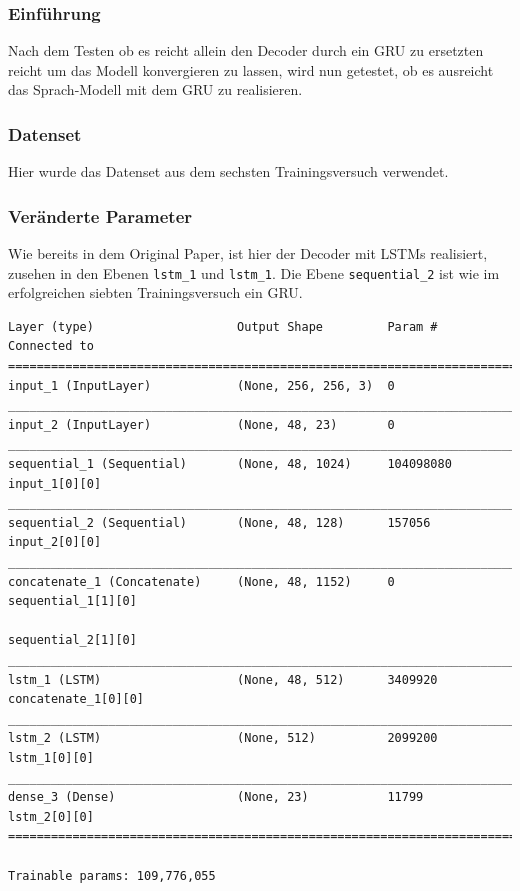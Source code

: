 \documentclass[pdftex,a4paper,halfparskip, article]{scrartcl}
\begin{document}
\subsubsection*{Einführung}

Nach dem Testen ob es reicht allein den Decoder durch ein GRU zu ersetzten reicht um das Modell konvergieren zu lassen, wird nun getestet, ob es ausreicht das Sprach-Modell mit dem GRU zu realisieren.

\subsubsection*{Datenset}

Hier wurde das Datenset aus dem sechsten Trainingsversuch verwendet.

\subsubsection*{Veränderte Parameter}

Wie bereits in dem Original Paper, ist hier der Decoder mit LSTMs realisiert, zusehen in den Ebenen \texttt{lstm\_1} und \texttt{lstm\_1}. Die Ebene \texttt{sequential\_2} ist wie im erfolgreichen siebten Trainingsversuch ein GRU.

\begin{verbatim}
Layer (type)                    Output Shape         Param #     Connected to
===============================================================================
input_1 (InputLayer)            (None, 256, 256, 3)  0
_______________________________________________________________________________
input_2 (InputLayer)            (None, 48, 23)       0
_______________________________________________________________________________
sequential_1 (Sequential)       (None, 48, 1024)     104098080   input_1[0][0]
_______________________________________________________________________________
sequential_2 (Sequential)       (None, 48, 128)      157056      input_2[0][0]
_______________________________________________________________________________
concatenate_1 (Concatenate)     (None, 48, 1152)     0           sequential_1[1][0]
                                                                 sequential_2[1][0]
_______________________________________________________________________________
lstm_1 (LSTM)                   (None, 48, 512)      3409920     concatenate_1[0][0]
_______________________________________________________________________________
lstm_2 (LSTM)                   (None, 512)          2099200     lstm_1[0][0]
_______________________________________________________________________________
dense_3 (Dense)                 (None, 23)           11799       lstm_2[0][0]
===============================================================================

Trainable params: 109,776,055

\end{verbatim}
\end{document}
